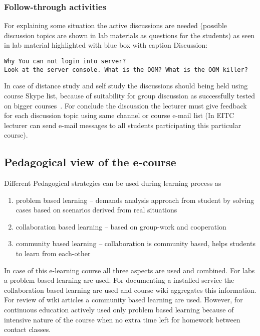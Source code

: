 \subsubsection{Follow-through activities}
For explaining some situation the active discussions are needed (possible discussion topics are shown in lab materials as questions for the students) as seen in lab material highlighted with blue box with caption Discussion:
\begin{Verbatim}[frame=single,
label=Discussion,framesep=2mm,rulecolor=\color{blue},commandchars=\\\{\}]
Why You can not login into server?
Look at the server console. What is the OOM? What is the OOM killer?
\end{Verbatim}
In case of distance study and self study the discussions should being held using course Skype list, because of suitability for group discussion as successfully tested on bigger courses~\citep{website:kakk_teistmoodi_e}. For conclude the discussion the lecturer must give feedback for each discussion topic using same channel or course e-mail list (In \gls{EITC} lecturer can send e-mail messages to all students participating this particular course).



\subsection{Pedagogical view of the e-course}
Different Pedagogical strategies can be used during learning process as \citep{OppeArenduskeskus2010}
\begin{enumerate}
\item problem based learning -- demands analysis approach from student by solving cases based on scenarios derived from real situations
\item collaboration based learning -- based on group-work and cooperation
\item community based learning -- collaboration is community based, helps students to learn from each-other
\end{enumerate}

In case of this e-learning course all three aspects are used and combined.
For labs a problem based learning are used. For documenting a installed service the collaboration based learning are used and course wiki aggregates this information. For review of wiki articles a community based learning are used. However, for continuous education actively used only problem based learning because of intensive nature of the course when no extra time left for homework between contact classes.

